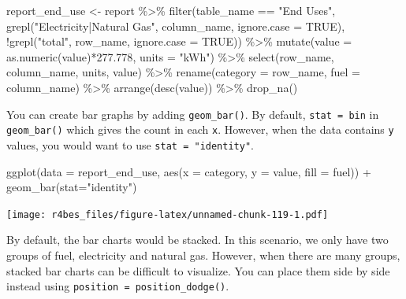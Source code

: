 \documentclass[
]{book}
\newenvironment{Shaded}{\begin{snugshade}}{\end{snugshade}}
\newcommand{\AttributeTok}[1]{\textcolor[rgb]{0.77,0.63,0.00}{#1}}
\newcommand{\ConstantTok}[1]{\textcolor[rgb]{0.00,0.00,0.00}{#1}}
\newcommand{\FloatTok}[1]{\textcolor[rgb]{0.00,0.00,0.81}{#1}}
\newcommand{\FunctionTok}[1]{\textcolor[rgb]{0.00,0.00,0.00}{#1}}
\newcommand{\NormalTok}[1]{#1}
\newcommand{\OtherTok}[1]{\textcolor[rgb]{0.56,0.35,0.01}{#1}}
\newcommand{\SpecialCharTok}[1]{\textcolor[rgb]{0.00,0.00,0.00}{#1}}
\newcommand{\StringTok}[1]{\textcolor[rgb]{0.31,0.60,0.02}{#1}}
\begin{document}
\begin{Shaded}
\begin{Highlighting}[]
\NormalTok{report\_end\_use }\OtherTok{\textless{}{-}}\NormalTok{ report }\SpecialCharTok{\%\textgreater{}\%}
    \FunctionTok{filter}\NormalTok{(table\_name }\SpecialCharTok{==} \StringTok{"End Uses"}\NormalTok{, }
           \FunctionTok{grepl}\NormalTok{(}\StringTok{"Electricity|Natural Gas"}\NormalTok{, column\_name, }\AttributeTok{ignore.case =} \ConstantTok{TRUE}\NormalTok{),}
           \SpecialCharTok{!}\FunctionTok{grepl}\NormalTok{(}\StringTok{"total"}\NormalTok{, row\_name, }\AttributeTok{ignore.case =} \ConstantTok{TRUE}\NormalTok{)) }\SpecialCharTok{\%\textgreater{}\%}
    \FunctionTok{mutate}\NormalTok{(}\AttributeTok{value =} \FunctionTok{as.numeric}\NormalTok{(value)}\SpecialCharTok{*}\FloatTok{277.778}\NormalTok{,}
           \AttributeTok{units =} \StringTok{"kWh"}\NormalTok{) }\SpecialCharTok{\%\textgreater{}\%}
    \FunctionTok{select}\NormalTok{(row\_name, column\_name, units, value) }\SpecialCharTok{\%\textgreater{}\%}
    \FunctionTok{rename}\NormalTok{(}\AttributeTok{category =}\NormalTok{ row\_name, }\AttributeTok{fuel =}\NormalTok{ column\_name) }\SpecialCharTok{\%\textgreater{}\%}
    \FunctionTok{arrange}\NormalTok{(}\FunctionTok{desc}\NormalTok{(value)) }\SpecialCharTok{\%\textgreater{}\%}
    \FunctionTok{drop\_na}\NormalTok{()}
\end{Highlighting}
\end{Shaded}

You can create bar graphs by adding \texttt{geom\_bar()}. By default, \texttt{stat\ =\ bin} in \texttt{geom\_bar()} which gives the count in each \texttt{x}. However, when the data contains \texttt{y} values, you would want to use \texttt{stat\ =\ "identity"}.

\begin{Shaded}
\begin{Highlighting}[]
\FunctionTok{ggplot}\NormalTok{(}\AttributeTok{data =}\NormalTok{ report\_end\_use, }\FunctionTok{aes}\NormalTok{(}\AttributeTok{x =}\NormalTok{ category, }\AttributeTok{y =}\NormalTok{ value, }\AttributeTok{fill =}\NormalTok{ fuel)) }\SpecialCharTok{+}
    \FunctionTok{geom\_bar}\NormalTok{(}\AttributeTok{stat=}\StringTok{"identity"}\NormalTok{)}
\end{Highlighting}
\end{Shaded}

\texttt{[image: r4bes\_files/figure-latex/unnamed-chunk-119-1.pdf]}

By default, the bar charts would be stacked. In this scenario, we only have two groups of fuel, electricity and natural gas. However, when there are many groups, stacked bar charts can be difficult to visualize. You can place them side by side instead using \texttt{position\ =\ position\_dodge()}.
\end{document}
